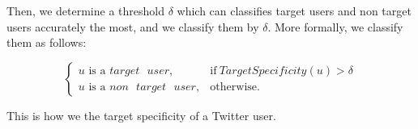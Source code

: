 Then, we determine a threshold $\delta$ which can classifies target
users and non target users accurately the most, and we classify them by
$\delta$.  More formally, we classify them as follows:

\vspace{-1ex}
\[
\begin{cases}
u\mbox{ is a } \mathit{target}\mbox{ }\mathit{user}, & \mbox{if}\
\mathit{TargetSpecificity}(u) > \delta \\
u\mbox{ is a }\mathit{non}\mbox{ }\mathit{target}\mbox{ }\mathit{user}, & \mbox{otherwise}.
\end{cases}
\]
\vspace{-2ex}

This is how we the target specificity of a Twitter user.